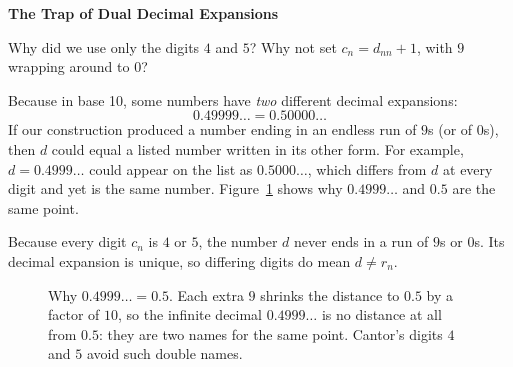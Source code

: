 \begin{trapbox}
\textbf{The Trap of Dual Decimal Expansions}

Why did we use only the digits $4$ and $5$? Why not set $c_n = d_{nn} + 1$, with $9$ wrapping around to $0$?

Because in base 10, some numbers have \emph{two} different decimal expansions:
\[
0.49999\dots = 0.50000\dots
\]
If our construction produced a number ending in an endless run of $9$s (or of $0$s), then $d$ could equal a listed number written in its other form. For example, $d = 0.4999\dots$ could appear on the list as $0.5000\dots$, which differs from $d$ at every digit and yet is the same number. Figure~\ref{19:fig-dual-decimal} shows why $0.4999\dots$ and $0.5$ are the same point.

Because every digit $c_n$ is $4$ or $5$, the number $d$ never ends in a run of $9$s or $0$s. Its decimal expansion is unique, so differing digits do mean $d \neq r_n$.
\end{trapbox}

\begin{figure}[htbp]
\centering
{}
\caption{Why $0.4999\dots = 0.5$. Each extra $9$ shrinks the distance to $0.5$ by a factor of $10$, so the infinite decimal $0.4999\dots$ is no distance at all from $0.5$: they are two names for the same point. Cantor's digits $4$ and $5$ avoid such double names.}
\label{19:fig-dual-decimal}
\end{figure}

